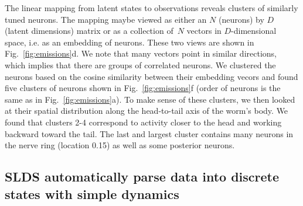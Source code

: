 \documentclass[11pt]{article}
\begin{document}
The linear mapping from latent states to observations reveals clusters
of similarly tuned neurons.  The mapping maybe viewed as either an $N$
(neurons) by $D$ (latent dimensions) matrix or as a collection of~$N$
vectors in $D$-dimensional space, i.e. as an embedding of neurons.
These two views are shown in Fig.~\ref{fig:emissions}d. We note that
many vectors point in similar directions, which implies that there are
groups of correlated neurons.  We clustered the neurons based on the
cosine similarity between their embedding vecors and found five clusters
of neurons shown in Fig.~\ref{fig:emissions}f (order of neurons is the same
as in Fig.~\ref{fig:emissions}a). To make sense of these clusters, we then
looked at their spatial distribution along the head-to-tail axis of the
worm's body.  We found that clusters 2-4 correspond to activity closer to
the head and working backward toward the tail.  The last and largest cluster
contains many neurons in the nerve ring (location 0.15)  as well
as some posterior neurons. 


\subsection*{SLDS automatically parse data into discrete states with simple dynamics}
\end{document}
